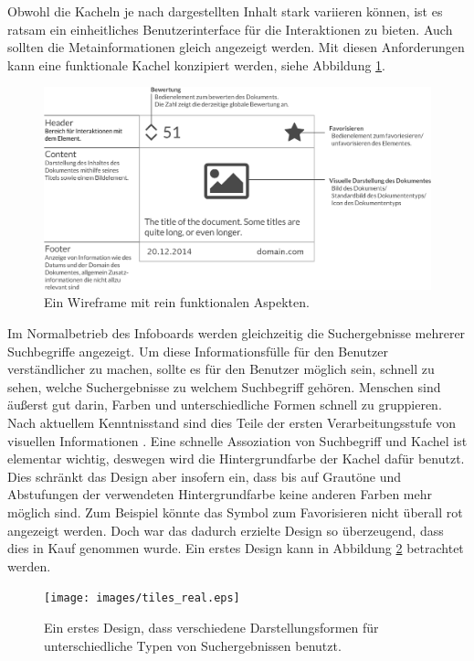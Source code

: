 \documentclass[12pt,twoside]{book}
\begin{document}
Obwohl die Kacheln je nach dargestellten Inhalt stark variieren können, ist es ratsam ein einheitliches Benutzerinterface für die Interaktionen zu bieten. Auch sollten die Metainformationen gleich angezeigt werden.
Mit diesen Anforderungen kann eine funktionale Kachel konzipiert werden, siehe Abbildung \ref{fig:tile_prototype}.

\begin{figure}[htbp]
    \centering
    \includegraphics[width=1.0\textwidth]{images/tiles.eps}
    \caption{Ein Wireframe mit rein funktionalen Aspekten.}
    \label{fig:tile_prototype}
\end{figure}

Im Normalbetrieb des Infoboards werden gleichzeitig die Suchergebnisse mehrerer Suchbegriffe angezeigt. Um diese Informationsfülle für den Benutzer verständlicher zu machen, sollte es für den Benutzer möglich sein, schnell zu sehen, welche Suchergebnisse zu welchem Suchbegriff gehören.
Menschen sind äußerst gut darin, Farben und unterschiedliche Formen schnell zu gruppieren. Nach aktuellem Kenntnisstand sind dies Teile der ersten Verarbeitungsstufe von visuellen Informationen \citep{treisman1987merkmale}. Eine schnelle Assoziation von Suchbegriff und Kachel ist elementar wichtig, deswegen wird die Hintergrundfarbe der Kachel dafür benutzt. Dies schränkt das Design aber insofern ein, dass bis auf Grautöne und Abstufungen der verwendeten Hintergrundfarbe keine anderen Farben mehr möglich sind. Zum Beispiel könnte das Symbol zum Favorisieren nicht überall rot angezeigt werden. Doch war das dadurch erzielte Design so überzeugend, dass dies in Kauf genommen wurde. Ein erstes Design kann in Abbildung \ref{fig:tile_design} betrachtet werden.

\begin{figure}[htbp]
    \centering
    \texttt{[image: images/tiles\_real.eps]}
    \caption{Ein erstes Design, dass verschiedene Darstellungsformen für unterschiedliche Typen von Suchergebnissen benutzt.}
    \label{fig:tile_design}
\end{figure}
\end{document}
